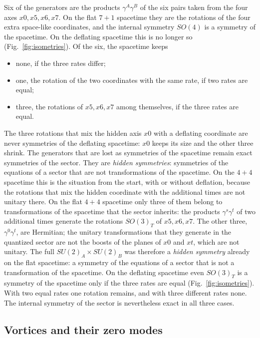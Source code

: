 Six of the generators are the products $\gamma^{A}\gamma^{B}$ of the six pairs taken from the four
axes $x0,x5,x6,x7$.
On the flat $7+1$ spacetime they are the rotations of the four extra space-like coordinates, and the
internal symmetry $SO(4)$ is a symmetry of the spacetime. On the deflating spacetime this is no
longer so (Fig.~\ref{fig:isometries}). Of the six, the spacetime keeps
\begin{itemize}
\item none, if the three rates differ;
\item one, the rotation of the two coordinates with the same rate, if two rates are equal;
\item three, the rotations of $x5,x6,x7$ among themselves, if the three rates are equal.
\end{itemize}
The three rotations that mix the hidden axis $x0$ with a deflating coordinate are never symmetries
of the deflating spacetime: $x0$ keeps its size and the other three shrink. The generators that are
lost as symmetries of the spacetime remain exact symmetries of the sector. They are \emph{hidden
symmetries}: symmetries of the equations of a sector that are not transformations of the spacetime.
On the $4+4$ spacetime this is the situation from the start, with or without deflation, because
the rotations that mix the hidden coordinate with the additional times are not unitary there.
On the flat $4+4$ spacetime only three of them belong to transformations of the spacetime that the
sector inherits: the products $\gamma^{s}\gamma^{t}$ of two additional times generate the rotations
$SO(3)_T$ of $x5,x6,x7$. The other three, $\gamma^{0}\gamma^{t}$, are Hermitian; the unitary
transformations that they generate in the quantized sector are not the boosts of the planes of $x0$
and $xt$, which are not unitary. The full $SU(2)_A\times SU(2)_B$ was therefore a \emph{hidden
symmetry} already on the flat spacetime: a symmetry of the equations of a sector that is not a
transformation of the spacetime. On the deflating spacetime even $SO(3)_T$ is a
symmetry of the spacetime only if the three rates are equal (Fig.~\ref{fig:isometries}). With two
equal rates one rotation remains, and with three different rates none. The internal symmetry of the
sector is nevertheless exact in all three cases.

\subsection{Vortices and their zero modes}
\label{sec:vortex}

